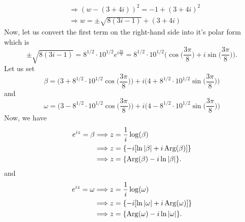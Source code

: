 \documentclass[a4paper]{article}
\begin{document}
\begin{enumerate}
\begin{solution}
\begin{align*}
                                          &\Longrightarrow (w - (3+4i))^{2} = -1 + (3+4i)^{2} \\
                                          &\Longrightarrow w = \pm \sqrt{ 8(3i-1) } + (3+4i)  
        \end{align*}
        Now, let us convert the first term on the right-hand side into it's polar form which is 
        \[ \pm \sqrt{ 8 (3i - 1) } = 8^{1/2} \cdot 10^{1/2} e^{i \frac{ 3 \pi }{ 8 } } = 8^{1/2} \cdot 10^{1/2} \Big(  \cos \Big(  \frac{ 3 \pi }{ 8 }  \Big) + i \sin \Big(  \frac{ 3 \pi  }{ 8 }  \Big) \Big). \]
        Let us set 
        \[  \beta = \Big(  3 + 8^{1/2}\cdot 10^{1/2} \cos \Big(  \frac{ 3 \pi }{ 8 }  \Big) \Big) + i \Big(  4 + 8^{1/2} \cdot 10^{1/2} \sin \Big(  \frac{ 3 \pi  }{ 8 }  \Big) \Big)\]
        and
        \[  \omega = \Big(  3 - 8^{1/2}\cdot 10^{1/2} \cos \Big(  \frac{ 3 \pi }{ 8 }  \Big) \Big) + i \Big(  4 - 8^{1/2} \cdot 10^{1/2} \sin \Big(  \frac{ 3 \pi  }{ 8 }  \Big) \Big)\]
        Now, we have
        \begin{align*}
            e^{iz} = \beta &\Longrightarrow z  = \frac{ 1 }{ i }  \log (\beta )  \\
                           &\Longrightarrow z = \{ -i [\ln | \beta  |  + i \operatorname{Arg}(\beta)] \} \\  
                           &\Longrightarrow z = \{ \operatorname{Arg}(\beta) - i \ln | \beta | \}.
        \end{align*}
        and
        \begin{align*}
            e^{iz} = \omega &\Longrightarrow z  = \frac{ 1 }{ i }  \log (\omega )  \\
                           &\Longrightarrow z = \{ -i [\ln | \omega  |  + i \operatorname{Arg}(\omega)] \} \\  
                           &\Longrightarrow z = \{ \operatorname{Arg}(\omega) - i \ln | \omega | \}.
        \end{align*}
        \end{solution}
\end{enumerate}
\end{document}
